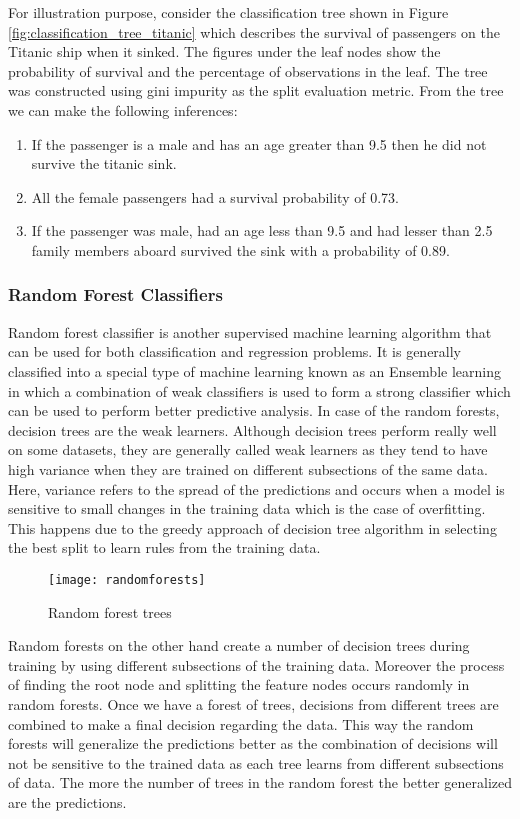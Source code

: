\documentclass[11pt,openright]{report}
\begin{document}
For illustration purpose, consider the classification tree shown in Figure \ref{fig:classification_tree_titanic}  which describes the survival of passengers on the Titanic ship when it sinked. The figures under the leaf nodes show the probability of survival and the percentage of observations in the leaf. The tree was constructed using gini impurity as the split evaluation metric. From the tree we can make the following inferences: 
\begin{enumerate}
  \item If the passenger is a male and has an age greater than 9.5 then he did not survive the titanic sink.
  \item All the female passengers had a survival probability of 0.73.
  \item If the passenger was male, had an age less than 9.5 and had lesser than 2.5 family members aboard survived the sink with a probability of 0.89.
\end{enumerate}


\subsubsection {Random Forest Classifiers}  \label{sssec:rf}
Random forest classifier is another supervised machine learning algorithm that can be used for both classification and regression problems. It is generally classified into a special type of machine learning known as an Ensemble learning in which a combination of weak classifiers is used to form a strong classifier which can be used to perform better predictive analysis. In case of the random forests, decision trees are the weak learners.  Although decision trees perform really well on some datasets, they are generally called weak learners as they tend to have high variance when they are trained on different subsections of the same data. Here, variance refers to the spread of the predictions and occurs when a model is sensitive to small changes in the training data which is the case of overfitting. This happens due to the greedy approach of decision tree algorithm in selecting the best split to learn rules from the training data.
  \begin{figure}
	\centering
	\texttt{[image: randomforests]}
	\caption{Random forest trees}
	\label{fig:random_forest_trees}
\end{figure} 


Random forests on the other hand create a number of decision trees during training by using different subsections of the training data. Moreover the process of finding the root node and splitting the feature nodes occurs randomly in random forests. Once we have a forest of trees, decisions from different trees are combined to make a final decision regarding the data. This way the random forests will generalize the predictions better as the combination of decisions will not be sensitive to the trained data as each tree learns from different subsections of data. The more the number of trees in the random forest the better generalized are the predictions.
\end{document}

